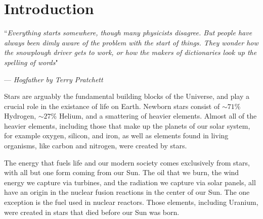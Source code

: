 \documentclass[../dissertation.tex]{subfiles}
\begin{document}
\chapter{Introduction}
\label{ch:intro}

\singlespace
\epigraph{``\emph{Everything starts somewhere, though many physicists disagree. But people have always been dimly aware of the problem with the start of things. They wonder how the snowplough driver gets to work, or how the makers of dictionaries look up the spelling of words}"}{--- \textit{Hogfather by Terry Pratchett}}

\dblspace

Stars are arguably the fundamental building blocks of the Universe, 
and play a crucial role in the existance of life on Earth. Newborn stars consist of $\sim 71 \%$ Hydrogen, $\sim 27 \%$ Helium, and a smattering of heavier elements. Almost all of the heavier elements, including those that make up the planets of our solar system, for example oxygen, silicon, and iron, as well as elements found in living organisms, like carbon and nitrogen, were created by stars. 

The energy that fuels life and our modern society comes exclusively from stars, with all but one form coming from our Sun. 
The oil that we burn, the wind energy we capture via turbines, 
and the radiation we capture via solar panels, all have an origin in the nuclear fusion reactions in the center of our Sun. 
The one exception is the fuel used in nuclear reactors. Those elements, including Uranium,  were created in stars that died before our Sun was born.





\end{document}
